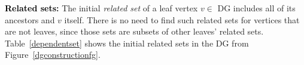 {%

{\bf \textcolor{black}{Related sets}:}
The initial {\em related set} of a leaf vertex $v \in$ DG includes all of its ancestors and $v$ itself.
There is no need to find such related sets for vertices that are not leaves,
since those sets are subsets of other leaves' related sets.
Table~\ref{dependentset} shows the
initial related sets in the DG from Figure~\ref{dgconstructionfg}.

}
